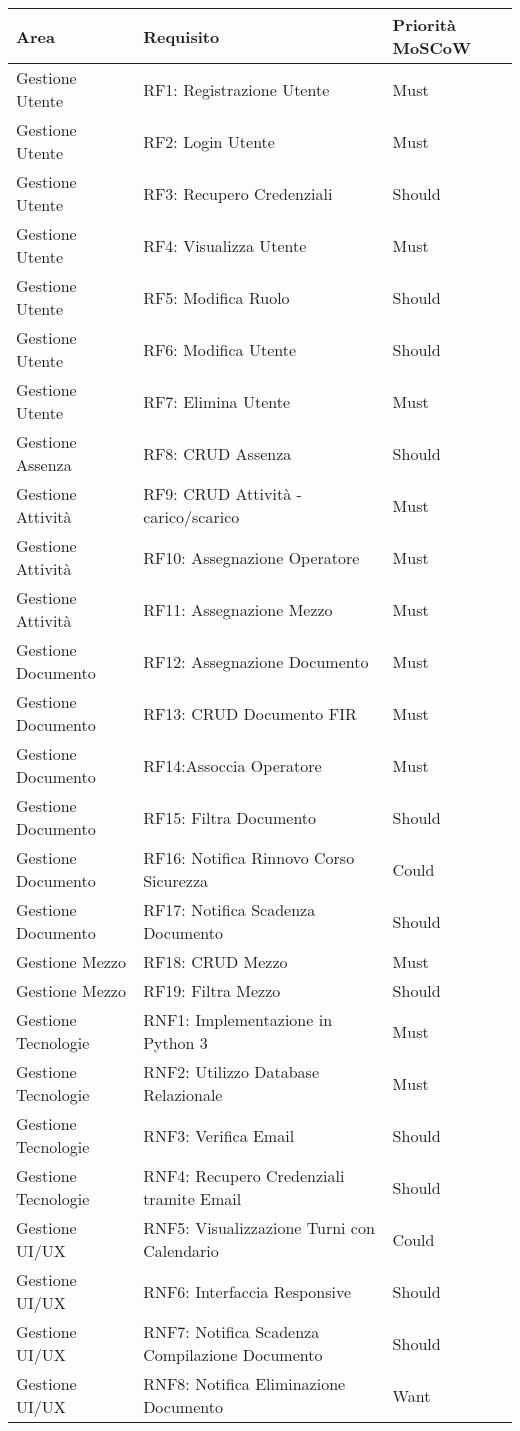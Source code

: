 \documentclass[a4paper]{report}
\begin{document}
\begin{longtable}{|p{4.5cm}|p{6.25cm}|p{2cm}|}
\hline
	\textbf{Area} & \textbf{Requisito} & \textbf{Priorità MoSCoW} \\
\hline
\endhead

Gestione Utente & RF1: Registrazione Utente & Must \\
\hline
Gestione Utente & RF2: Login Utente & Must \\
\hline
Gestione Utente & RF3: Recupero Credenziali & Should \\
\hline
Gestione Utente & RF4: Visualizza Utente & Must \\
\hline
Gestione Utente & RF5: Modifica Ruolo & Should \\
\hline
Gestione Utente & RF6: Modifica Utente & Should \\
\hline
Gestione Utente & RF7: Elimina Utente & Must \\
\hline
Gestione Assenza & RF8: CRUD Assenza & Should \\
\hline
Gestione Attività & RF9: CRUD Attività - carico/scarico & Must \\
\hline
Gestione Attività & RF10: Assegnazione Operatore & Must \\
\hline
Gestione Attività & RF11: Assegnazione Mezzo & Must \\
\hline
Gestione Documento & RF12: Assegnazione Documento & Must \\
\hline
Gestione Documento & RF13: CRUD Documento FIR & Must \\
\hline
Gestione Documento & RF14:Assoccia Operatore & Must \\
\hline
Gestione Documento & RF15: Filtra Documento & Should \\
\hline
Gestione Documento & RF16: Notifica Rinnovo Corso Sicurezza & Could \\
\hline
Gestione Documento & RF17: Notifica Scadenza Documento & Should \\
\hline
Gestione Mezzo & RF18: CRUD Mezzo & Must \\
\hline
Gestione Mezzo & RF19: Filtra Mezzo & Should \\
\hline
Gestione Tecnologie & RNF1: Implementazione in Python 3 & Must \\
\hline
Gestione Tecnologie & RNF2: Utilizzo Database Relazionale & Must \\
\hline
Gestione Tecnologie & RNF3: Verifica Email & Should \\
\hline
Gestione Tecnologie & RNF4: Recupero Credenziali tramite Email & Should \\
\hline
Gestione UI/UX & RNF5: Visualizzazione Turni con Calendario & Could \\
\hline
Gestione UI/UX & RNF6: Interfaccia Responsive & Should \\
\hline
Gestione UI/UX & RNF7: Notifica Scadenza Compilazione Documento & Should \\
\hline
Gestione UI/UX & RNF8: Notifica Eliminazione Documento & Want \\
\hline
\end{longtable}
\end{document}
